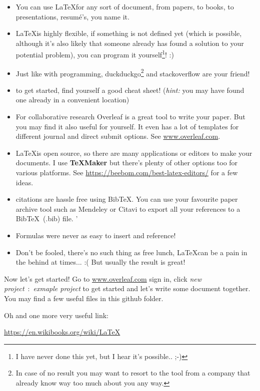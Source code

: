 \documentclass[]{article}
\begin{document}
\begin{itemize}
\item You can use \LaTeX for any sort of document, from papers, to books, to presentations, resumé's, you name it. 
\item \LaTeX is highly flexible, if something is not defined yet (which is possible, although it's also likely that someone already has found a solution to your potential problem), you can program it yourself\footnote{I have never done this yet, but I hear it's possible.. ;-)}! :)
\item Just like with programming, duckduckgo\footnote{In case of no result you may want to resort to the tool from a company that already know way too much about you any way.} and stackoverflow are your friend!
\item to get started, find yourself a good cheat sheet! ({\it hint:} you may have found one already in a convenient location)
\item For collaborative research Overleaf is a great tool to write your paper. But you may find it also useful for yourself. It even has a lot of templates for different journal and direct submit options. See \url{www.overleaf.com}.
\item \LaTeX is open source, so there are many applications or editors to make your documents. I use {\large\bf\TeX Maker} but there's plenty of other options too for various platforms. See \url{https://beebom.com/best-latex-editors/} for a few ideas.
\item citations are hassle free using {\LARGE Bib\TeX}. You can use your favourite paper archive tool such as Mendeley or Citavi to export all your references to a Bib\TeX\ (.bib) file. '
\item Formulas were never as easy to insert and reference!
\item Don't be fooled, there's no such thing as free lunch, \LaTeX can be a pain in the behind at times... :(  But usually the result is great! 
\end{itemize}

Now let's get started! Go to \url{www.overleaf.com} sign in, click \emph{new project}\ :\ \emph{exmaple project} to get started and let's write some document together. You may find a few useful files  in this github folder. 

Oh and one more very useful link:
\begin{center}
{\Large \url{https://en.wikibooks.org/wiki/LaTeX}}
\end{center}
\end{document}
